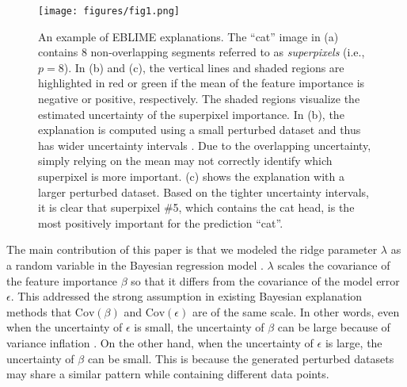 \documentclass{article}
\theoremstyle{plain}
\theoremstyle{definition}
\theoremstyle{remark}
\begin{document}

\begin{figure}[hbt]
\begin{center}
\centerline{\texttt{[image: figures/fig1.png]}}
\caption{An example of EBLIME explanations. The ``cat'' image in (a) contains 8 non-overlapping segments referred to as \emph{superpixels} (i.e., $p=8$). In (b) and (c), the vertical lines and shaded regions are highlighted in red or green if the mean of the feature importance is negative or positive, respectively. The shaded regions visualize the estimated uncertainty of the superpixel importance. In (b), the explanation is computed using a small perturbed dataset and thus has wider uncertainty intervals \cite{bayeslime}. Due to the overlapping uncertainty, simply relying on the mean may not correctly identify which superpixel is more important. (c) shows the explanation with a larger perturbed dataset. Based on the tighter uncertainty intervals, it is clear that superpixel \#5, which contains the cat head, is the most positively important for the prediction ``cat''.}
\label{sonic}
\end{center}
\end{figure}

The main contribution of this paper is that we modeled the ridge parameter $\lambda$ as a random variable in the Bayesian regression model \cite{bishop2006}. $\lambda$ scales the covariance of the feature importance $\beta$ so that it differs from the covariance of the model error $\epsilon$. This addressed the strong assumption in existing Bayesian explanation methods that $\textrm{Cov}(\beta)$ and $\textrm{Cov}(\epsilon)$ are of the same scale. In other words, even when the uncertainty of $\epsilon$ is small, the uncertainty of $\beta$ can be large because of variance inflation \cite{james2013}. On the other hand, when the uncertainty of $\epsilon$ is large, the uncertainty of $\beta$ can be small. This is because the generated perturbed datasets may share a similar pattern while containing different data points. 
\end{document}
